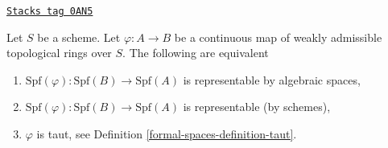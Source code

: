 \begin{lemma}
\label{formal-spaces-lemma-representable-affine}
\href{https://stacks.math.columbia.edu/tag/0AN5}{\texttt{Stacks tag 0AN5}}

Let $S$ be a scheme. Let $\varphi : A \to B$ be a continuous map of
weakly admissible topological rings over $S$. The following
are equivalent
\begin{enumerate}
\item $\text{Spf}(\varphi) : \text{Spf}(B) \to \text{Spf}(A)$
is representable by algebraic spaces,
\item $\text{Spf}(\varphi) : \text{Spf}(B) \to \text{Spf}(A)$
is representable (by schemes),
\item $\varphi$ is taut, see Definition \ref{formal-spaces-definition-taut}.
\end{enumerate}
\end{lemma}

